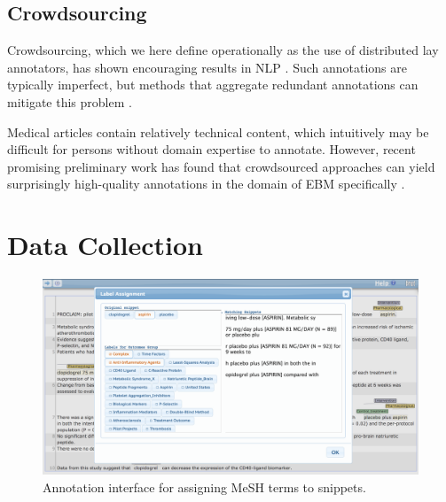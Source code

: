 \documentclass[11pt,a4paper]{article}
\begin{document}
\subsection{Crowdsourcing}

Crowdsourcing, which we here define operationally as the use of distributed lay annotators, has shown encouraging results in NLP \cite{novotney2010cheap,sabou2012crowdsourcing}. Such annotations are typically imperfect, but methods that aggregate redundant annotations can mitigate this problem \cite{dalvi2013aggregating,hovy2014experiments,nguyen2017aggregating}.

Medical articles contain relatively technical content, which intuitively may be difficult for persons without domain expertise to annotate. However, recent promising preliminary work has found that crowdsourced approaches can yield surprisingly high-quality annotations in the domain of EBM specifically \cite{mortensen2017exploration,thomas2017living,wallace2017identifying}. 







\section{Data Collection}
\label{section:collection}

\begin{figure}
\centering
\includegraphics[width=0.8\linewidth]{figs/mesh_interface}
\caption{Annotation interface for assigning MeSH terms to snippets.}
\end{figure}
\end{document}
